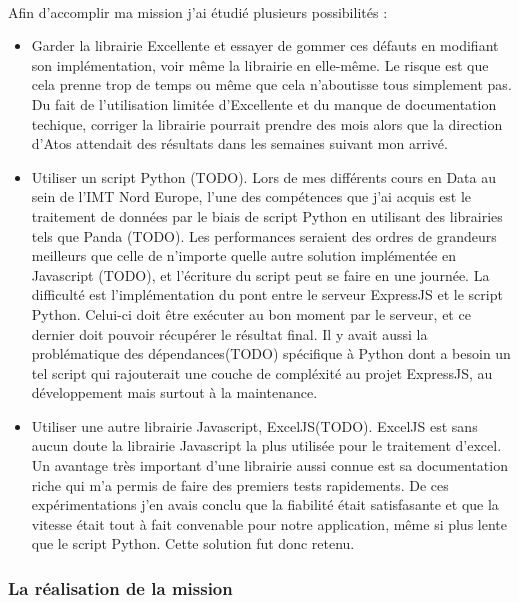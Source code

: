 \documentclass[12pt]{article}
\begin{document}
\begin {sloppypar}
\paragraph {}
Afin d'accomplir ma mission j'ai étudié plusieurs possibilités : 
\begin{itemize}
  \item 
    Garder la librairie Excellente et essayer de gommer ces défauts en modifiant
    son implémentation, voir même la librairie en elle-même. 
    Le risque est que cela prenne trop de temps ou même que cela n'aboutisse tous 
    simplement pas. Du fait de l'utilisation limitée d'Excellente et du manque de documentation 
    techique, corriger la librairie pourrait prendre des mois alors que la direction d'Atos 
    attendait des résultats dans les semaines suivant mon arrivé.
  \item 
    Utiliser un script Python (TODO). Lors de mes différents cours en Data au sein de l'IMT Nord 
    Europe, l'une des compétences que j'ai acquis est le traitement de données par le biais 
    de script Python en utilisant des librairies tels que Panda (TODO). Les performances 
    seraient des ordres de grandeurs meilleurs que celle de n'importe quelle autre solution 
    implémentée en Javascript (TODO), et l'écriture du script peut se faire en une journée. 
    La difficulté est l'implémentation du pont entre le serveur ExpressJS et le script Python. 
    Celui-ci doit être exécuter au bon moment par le serveur, et ce dernier doit pouvoir 
    récupérer le résultat final. Il y avait aussi la problématique des dépendances(TODO) spécifique
    à Python dont a besoin un tel script qui rajouterait une couche de compléxité au projet ExpressJS, au 
    développement mais surtout à la maintenance.
  \item 
    Utiliser une autre librairie Javascript, ExcelJS(TODO). ExcelJS est sans aucun doute 
    la librairie Javascript la plus utilisée pour le traitement d'excel. Un avantage très important 
    d'une librairie aussi connue est sa documentation riche qui m'a permis de faire des premiers 
    tests rapidements. De ces expérimentations j'en avais conclu que la fiabilité était 
    satisfasante et que la vitesse était tout à fait convenable pour notre application, même si 
    plus lente que le script Python. Cette solution fut donc retenu.
\end{itemize}
\newpage
\subsubsection{La réalisation de la mission}

\end{sloppypar}
\end{document}
